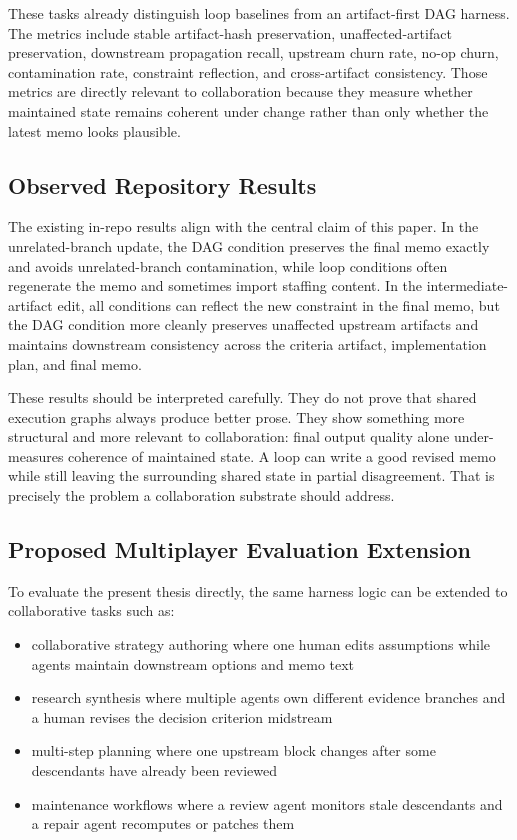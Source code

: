 \documentclass{article}
\begin{document}
These tasks already distinguish loop baselines from an artifact-first DAG harness. The metrics include stable artifact-hash preservation, unaffected-artifact preservation, downstream propagation recall, upstream churn rate, no-op churn, contamination rate, constraint reflection, and cross-artifact consistency. Those metrics are directly relevant to collaboration because they measure whether maintained state remains coherent under change rather than only whether the latest memo looks plausible.

\subsection{Observed Repository Results}

The existing in-repo results align with the central claim of this paper. In the unrelated-branch update, the DAG condition preserves the final memo exactly and avoids unrelated-branch contamination, while loop conditions often regenerate the memo and sometimes import staffing content. In the intermediate-artifact edit, all conditions can reflect the new constraint in the final memo, but the DAG condition more cleanly preserves unaffected upstream artifacts and maintains downstream consistency across the criteria artifact, implementation plan, and final memo.

These results should be interpreted carefully. They do not prove that shared execution graphs always produce better prose. They show something more structural and more relevant to collaboration: final output quality alone under-measures coherence of maintained state. A loop can write a good revised memo while still leaving the surrounding shared state in partial disagreement. That is precisely the problem a collaboration substrate should address.

\subsection{Proposed Multiplayer Evaluation Extension}

To evaluate the present thesis directly, the same harness logic can be extended to collaborative tasks such as:
\begin{itemize}
\item collaborative strategy authoring where one human edits assumptions while agents maintain downstream options and memo text
\item research synthesis where multiple agents own different evidence branches and a human revises the decision criterion midstream
\item multi-step planning where one upstream block changes after some descendants have already been reviewed
\item maintenance workflows where a review agent monitors stale descendants and a repair agent recomputes or patches them
\end{itemize}
\end{document}

